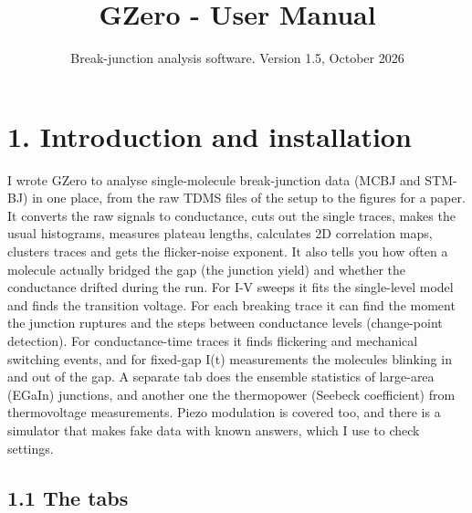 \documentclass[
  11pt,
  a4paper,
]{article}
\title{GZero - User Manual}
\subtitle{Break-junction analysis software. Version 1.5, October 2026}
\author{}
\date{}
\begin{document}
\maketitle

\renewcommand*\contentsname{Contents}
{
\hypersetup{linkcolor=}
\setcounter{tocdepth}{3}
\tableofcontents
}
\hypertarget{introduction-and-installation}{%
\section{1. Introduction and
installation}\label{introduction-and-installation}}

I wrote GZero to analyse single-molecule break-junction data (MCBJ and
STM-BJ) in one place, from the raw TDMS files of the setup to the
figures for a paper. It converts the raw signals to conductance, cuts
out the single traces, makes the usual histograms, measures plateau
lengths, calculates 2D correlation maps, clusters traces and gets the
flicker-noise exponent. It also tells you how often a molecule actually
bridged the gap (the junction yield) and whether the conductance drifted
during the run. For I-V sweeps it fits the single-level model and finds
the transition voltage. For each breaking trace it can find the moment
the junction ruptures and the steps between conductance levels
(change-point detection). For conductance-time traces it finds
flickering and mechanical switching events, and for fixed-gap I(t)
measurements the molecules blinking in and out of the gap. A separate
tab does the ensemble statistics of large-area (EGaIn) junctions, and
another one the thermopower (Seebeck coefficient) from thermovoltage
measurements. Piezo modulation is covered too, and there is a simulator
that makes fake data with known answers, which I use to check settings.

\hypertarget{the-tabs}{%
\subsection{1.1 The tabs}\label{the-tabs}}
\end{document}
